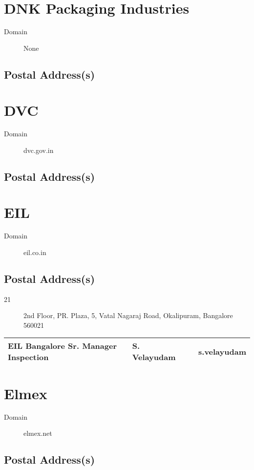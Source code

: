 \documentclass[a4paper, 11pt, twoside]{book}
\begin{document}
\section{DNK Packaging Industries}\label{com:54}
\begin{description}
\item[Domain]None
\end{description}
\subsection*{Postal Address(s)}
\section{DVC}\label{com:62}
\begin{description}
\item[Domain]dvc.gov.in
\end{description}
\subsection*{Postal Address(s)}
\section{EIL}\label{com:22}
\begin{description}
\item[Domain]eil.co.in
\end{description}
\subsection*{Postal Address(s)}
\begin{description}
\item [21]2nd Floor, PR. Plaza, 5, Vatal Nagaraj Road, Okalipuram, Bangalore 560021
\end{description}
\begin{tabular}{|p{4cm}|p{2cm}|p{2cm}|p{3cm}|}
\hline
EIL Bangalore Sr. Manager Inspection & S. Velayudam &  & s.velayudam \\ \hline
\end{tabular}
\section{Elmex}\label{com:45}
\begin{description}
\item[Domain]elmex.net
\end{description}
\subsection*{Postal Address(s)}
\end{document}
